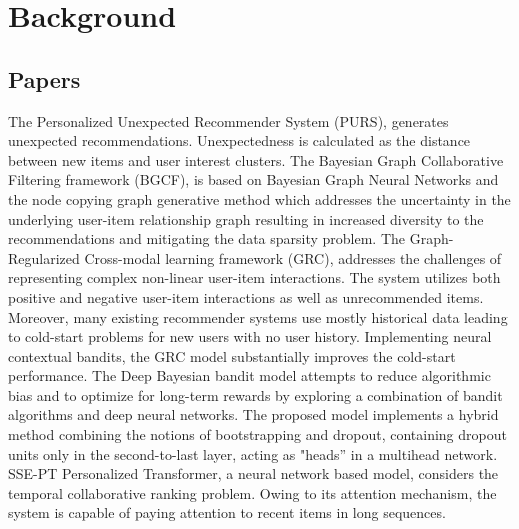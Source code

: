 \chapter{Background}
\section{Papers}
The Personalized Unexpected Recommender System (PURS), generates unexpected recommendations.  Unexpectedness is calculated as the distance between new items and user interest clusters. The Bayesian Graph Collaborative Filtering framework (BGCF), is based on Bayesian Graph Neural Networks and the node copying graph generative method which addresses the uncertainty in the underlying user-item relationship graph resulting in increased diversity to the recommendations and mitigating the data sparsity problem. The Graph-Regularized Cross-modal learning framework (GRC), addresses the challenges of representing complex non-linear user-item interactions. The system utilizes both positive and negative user-item interactions as well as unrecommended items. Moreover, many existing recommender systems use mostly historical data leading to cold-start problems for new users with no user history. Implementing neural contextual bandits, the GRC model substantially improves the cold-start performance. The Deep Bayesian bandit model attempts to reduce algorithmic bias and to optimize for long-term rewards by exploring a combination of bandit algorithms and deep neural networks. The proposed model implements a hybrid method combining the notions of bootstrapping and dropout, containing dropout units only in the second-to-last layer, acting as "heads” in a multihead network.
SSE-PT Personalized Transformer, a neural network based model,  considers the temporal collaborative ranking problem. Owing to its attention mechanism, the system is capable of paying attention to recent items in long sequences.

